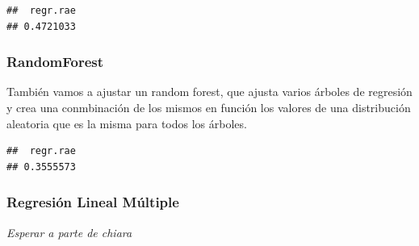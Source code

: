 \documentclass[
  11pt,
  a4paper,
]{article}
\newenvironment{Shaded}{\begin{snugshade}}{\end{snugshade}}
\newcommand{\AttributeTok}[1]{\textcolor[rgb]{0.77,0.63,0.00}{#1}}
\newcommand{\FunctionTok}[1]{\textcolor[rgb]{0.00,0.00,0.00}{#1}}
\newcommand{\NormalTok}[1]{#1}
\newcommand{\OtherTok}[1]{\textcolor[rgb]{0.56,0.35,0.01}{#1}}
\newcommand{\SpecialCharTok}[1]{\textcolor[rgb]{0.00,0.00,0.00}{#1}}
\newcommand{\StringTok}[1]{\textcolor[rgb]{0.31,0.60,0.02}{#1}}
\begin{document}
\begin{verbatim}
##  regr.rae 
## 0.4721033
\end{verbatim}

\subsubsection{RandomForest}

También vamos a ajustar un random forest, que ajusta varios árboles de
regresión y crea una conmbinación de los mismos en función los valores
de una distribución aleatoria que es la misma para todos los árboles.

\begin{Shaded}
\end{Shaded}

\begin{verbatim}
##  regr.rae 
## 0.3555573
\end{verbatim}

\subsubsection{Regresión Lineal Múltiple}

\emph{Esperar a parte de chiara}

\begin{Shaded}
\end{Shaded}
\end{document}
